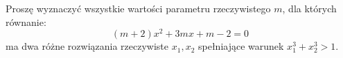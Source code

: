 Proszę wyznaczyć wszystkie wartości parametru rzeczywistego $m$, dla których równanie:
\[
        (m+2)x^2 + 3mx + m - 2 = 0
\]
ma dwa różne rozwiązania rzeczywiste $x_1,x_2$ spełniające warunek $x_1^3+x_2^3 > 1$.